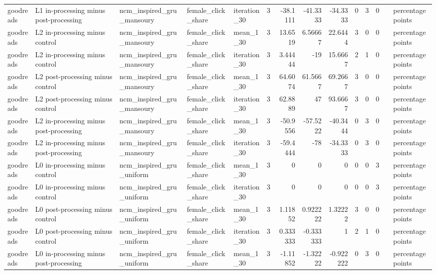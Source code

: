 \begin{table}[htbp!]
\begin{tabular}{lllllrrrrrrrll}
goodreads & L1 in-processing minus post-processing & ncm\_inspired\_gru\_mansoury & female\_click\_share & iteration\_30 & 3 & -38.1111 & -41.3333 & -34.3333 & 0 & 3 & 0 &  & percentage points \\
goodreads & L2 in-processing minus control & ncm\_inspired\_gru\_mansoury & female\_click\_share & mean\_1\_30 & 3 & 13.6519 & 6.56667 & 22.6444 & 3 & 0 & 0 &  & percentage points \\
goodreads & L2 in-processing minus control & ncm\_inspired\_gru\_mansoury & female\_click\_share & iteration\_30 & 3 & 3.44444 & -19 & 15.6667 & 2 & 1 & 0 &  & percentage points \\
goodreads & L2 post-processing minus control & ncm\_inspired\_gru\_mansoury & female\_click\_share & mean\_1\_30 & 3 & 64.6074 & 61.5667 & 69.2667 & 3 & 0 & 0 &  & percentage points \\
goodreads & L2 post-processing minus control & ncm\_inspired\_gru\_mansoury & female\_click\_share & iteration\_30 & 3 & 62.8889 & 47 & 93.6667 & 3 & 0 & 0 &  & percentage points \\
goodreads & L2 in-processing minus post-processing & ncm\_inspired\_gru\_mansoury & female\_click\_share & mean\_1\_30 & 3 & -50.9556 & -57.5222 & -40.3444 & 0 & 3 & 0 &  & percentage points \\
goodreads & L2 in-processing minus post-processing & ncm\_inspired\_gru\_mansoury & female\_click\_share & iteration\_30 & 3 & -59.4444 & -78 & -34.3333 & 0 & 3 & 0 &  & percentage points \\
goodreads & L0 in-processing minus control & ncm\_inspired\_gru\_uniform & female\_click\_share & mean\_1\_30 & 3 & 0 & 0 & 0 & 0 & 0 & 3 &  & percentage points \\
goodreads & L0 in-processing minus control & ncm\_inspired\_gru\_uniform & female\_click\_share & iteration\_30 & 3 & 0 & 0 & 0 & 0 & 0 & 3 &  & percentage points \\
goodreads & L0 post-processing minus control & ncm\_inspired\_gru\_uniform & female\_click\_share & mean\_1\_30 & 3 & 1.11852 & 0.922222 & 1.32222 & 3 & 0 & 0 &  & percentage points \\
goodreads & L0 post-processing minus control & ncm\_inspired\_gru\_uniform & female\_click\_share & iteration\_30 & 3 & 0.333333 & -0.333333 & 1 & 2 & 1 & 0 &  & percentage points \\
goodreads & L0 in-processing minus post-processing & ncm\_inspired\_gru\_uniform & female\_click\_share & mean\_1\_30 & 3 & -1.11852 & -1.32222 & -0.922222 & 0 & 3 & 0 &  & percentage points \\

\end{tabular}
\end{table}
